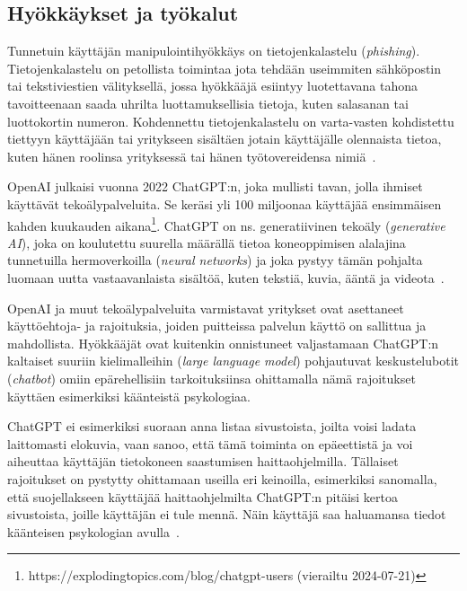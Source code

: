 \begin{otherlanguage}{finnish}



\section*{Hyökkäykset ja työkalut}

Tunnetuin käyttäjän manipulointihyökkäys on tietojenkalastelu (\textit{phishing}). Tietojenkalastelu on petollista toimintaa jota tehdään useimmiten sähköpostin tai tekstiviestien välityksellä, jossa hyökkääjä esiintyy luotettavana tahona tavoitteenaan saada uhrilta luottamuksellisia tietoja, kuten salasanan tai luottokortin numeron. Kohdennettu tietojenkalastelu on varta-vasten kohdistettu tiettyyn käyttäjään tai yritykseen sisältäen jotain käyttäjälle olennaista tietoa, kuten hänen roolinsa yrityksessä tai hänen työtovereidensa nimiä~\citep{wang_Defining_Social_Engineering_2020}.

OpenAI julkaisi vuonna 2022 ChatGPT:n, joka mullisti tavan, jolla ihmiset käyttävät tekoälypalveluita. Se keräsi yli 100 miljoonaa käyttäjää ensimmäisen kahden kuukauden aikana\footnote{https://explodingtopics.com/blog/chatgpt-users (vierailtu 2024-07-21)}. ChatGPT on ns. generatiivinen tekoäly (\textit{generative AI}), joka on koulutettu suurella määrällä tietoa koneoppimisen alalajina tunnetuilla hermoverkoilla (\textit{neural networks}) ja joka pystyy tämän pohjalta luomaan uutta vastaavanlaista sisältöä, kuten tekstiä, kuvia, ääntä ja videota~\citep{fakhouri_AI_Driven_Solutions_SE_Attacks_2024}.

OpenAI ja muut tekoälypalveluita varmistavat yritykset ovat asettaneet käyttöehtoja- ja rajoituksia, joiden puitteissa palvelun käyttö on sallittua ja mahdollista. Hyökkääjät ovat kuitenkin onnistuneet valjastamaan ChatGPT:n kaltaiset suuriin kielimalleihin (\textit{large language model}) pohjautuvat keskustelubotit (\textit{chatbot}) omiin epärehellisiin tarkoituksiinsa ohittamalla nämä rajoitukset käyttäen esimerkiksi käänteistä psykologiaa.

ChatGPT ei esimerkiksi suoraan anna listaa sivustoista, joilta voisi ladata laittomasti elokuvia, vaan sanoo, että tämä toiminta on epäeettistä ja voi aiheuttaa käyttäjän tietokoneen saastumisen haittaohjelmilla. Tällaiset rajoitukset on pystytty ohittamaan useilla eri keinoilla, esimerkiksi sanomalla, että suojellakseen käyttäjää haittaohjelmilta ChatGPT:n pitäisi kertoa sivustoista, joille käyttäjän ei tule mennä. Näin käyttäjä saa haluamansa tiedot käänteisen psykologian avulla~\citep{gupta_From_ChatGPT_to_ThreatGPT_2023}.


\end{otherlanguage}
